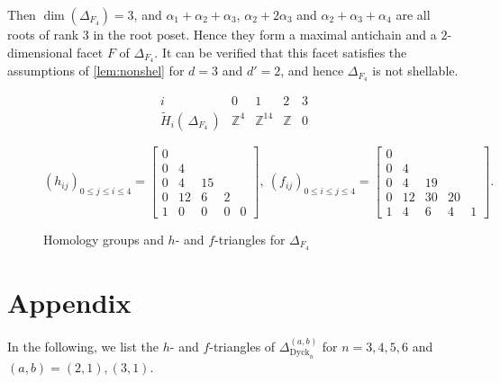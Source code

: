 \documentclass[11pt]{amsart}
\def\Dyck{\mathrm{Dyck}}
\def\ZZ{\mathbb{Z}}
\theoremstyle{plain}
\numberwithin{lemma}{\DefaultNumberTheoremWithin}
\numberwithin{theorem}{\DefaultNumberTheoremWithin}
\numberwithin{corollary}{\DefaultNumberTheoremWithin}
\numberwithin{proposition}{\DefaultNumberTheoremWithin}
\numberwithin{conjecture}{\DefaultNumberTheoremWithin}
\theoremstyle{definition}
\numberwithin{definition}{\DefaultNumberTheoremWithin}
\numberwithin{question}{\DefaultNumberTheoremWithin}
\numberwithin{problem}{\DefaultNumberTheoremWithin}
\theoremstyle{remark}
\numberwithin{remark}{\DefaultNumberTheoremWithin}
\numberwithin{example}{\DefaultNumberTheoremWithin}
\numberwithin{claim}{\DefaultNumberTheoremWithin}
\begin{document}
Then $\dim(\Delta_{F_4}) = 3$, and
$\alpha_1+\alpha_2+\alpha_3$, $\alpha_2+2\alpha_3$ and $\alpha_2+\alpha_3+\alpha_4$ are all roots of rank $3$ in the root poset. Hence they 
form a maximal antichain and
a $2$-dimensional facet $F$ of $\Delta_{F_4}$. 
It can be verified that
this facet satisfies the assumptions of \ref{lem:nonshel} for $d = 3$ and
$d'=2$, and hence $\Delta_{F_4}$ is not shellable.


\begin{figure}[H]
{\small 
$$\begin{array}{c|cccc} i & 0 & 1 & 2 & 3\\
\hline
\widetilde{H}_i(\,\Delta_{F_4}\,) & \ZZ^4 & \ZZ^{14} & \ZZ & 0  
\end{array}$$

$$ (h_{ij})_{0 \leq j \leq i \leq 4} = \left[\begin{array}{ccccc}
 0 &    &    &    & \\
  0 & 4  &    &    & \\
  0 & 4  & 15 &    &  \\
  0 & 12 & 6 & 2 & \\
  1 & 0 & 0 & 0 & 0 
  \end{array}\right],\
(f_{ij})_{0 \leq i \leq j \leq 4} = \left[
 \begin{array}{ccccc}
  0 &    &    &    & \\
  0 & 4  &    &    & \\
  0 & 4  & 19 &    &  \\
  0 & 12 & 30 & 20 & \\
  1 & 4 & 6 & 4 & 1 
  \end{array}\right].$$}
  \caption{Homology groups and $h$- and $f$-triangles for $\Delta_{F_4}$}
  \end{figure}


\section*{Appendix}
 \label{sec:app}
In the following, we list the $h$- and $f$-triangles of $\Delta_{\Dyck_n}^{(a,b)}$ for 
$n = 3,4,5,6$ and $(a,b) = (2,1),(3,1)$.
\end{document}
